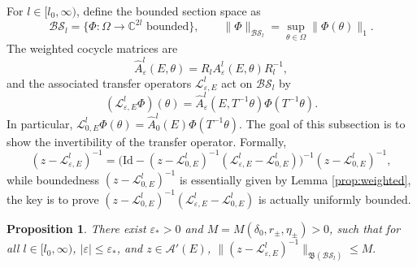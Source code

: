 \documentclass[reqno,11pt]{amsart}
\newtheorem{proposition}{Proposition}[section]
\newcommand{\C}{{\mathbb C}}
\begin{document}
For $l\in[l_0,\infty)$, define the bounded section space as 
$$
\mathcal{BS}_l = \bigl\{ \Phi:\Omega\to \C^{2l} \text{ bounded} \bigr\},
\qquad
\|\Phi\|_{\mathcal{BS}_l} = \sup_{\theta\in\Omega}\|\Phi(\theta)\|_{1}.
$$
The weighted cocycle matrices are
$$
\widehat A_{\varepsilon}^{l}(E,\theta) = R_l A_{\varepsilon}^{l}(E,\theta)R_l^{-1},
$$
and the associated transfer operators $\mathcal{L}^{l}_{\varepsilon,E}$ act on $\mathcal{BS}_l$ by
$$
(\mathcal{L}^{l}_{\varepsilon,E}\Phi)(\theta) = \widehat A^{l}_{\varepsilon}(E,T^{-1}\theta)\Phi(T^{-1}\theta).
$$
In particular, $\mathcal{L}^{l}_{0,E}\Phi(\theta) = \widehat A_{0}^{l}(E)\Phi(T^{-1}\theta)$. 
The goal of this subsection is to show the invertibility of the transfer operator.
Formally, 
\begin{equation}\label{eq:reso}
    (z-\mathcal{L}^{l}_{\varepsilon,E})^{-1} = \bigl(\mathrm{Id} - (z-\mathcal{L}^{l}_{0,E})^{-1}(\mathcal{L}^{l}_{\varepsilon,E} - \mathcal{L}^{l}_{0,E})\bigr)^{-1}(z-\mathcal{L}^{l}_{0,E})^{-1},
\end{equation}
while boundedness  $(z-\mathcal{L}^{l}_{0,E})^{-1}$ is essentially given by Lemma \ref{prop:weighted}, the key is to prove $ (z-\mathcal{L}^{l}_{0,E})^{-1}(\mathcal{L}^{l}_{\varepsilon,E} - \mathcal{L}^{l}_{0,E})$ is actually uniformly bounded. 


\begin{proposition}
\label{prop:improved}
There exist $\varepsilon_*>0$ and $M=M(\delta_0, r_\pm, \eta_\pm)>0$,  such that for all $l\in[l_0,\infty)$, $|\varepsilon|\le\varepsilon_*$, and $z\in\mathcal{A}'(E)$,
$\bigl\|(z-\mathcal{L}^{l}_{\varepsilon,E})^{-1}\bigr\|_{\mathfrak{B}(\mathcal{BS}_l )} \le M.$
\end{proposition}
\end{document}
